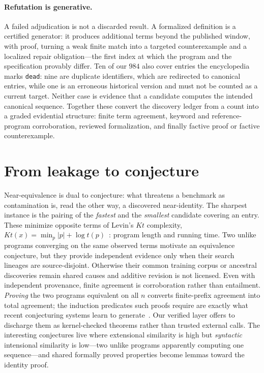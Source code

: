 \documentclass[11pt]{article}
\newcommand{\code}[1]{\texttt{#1}}
\begin{document}
\paragraph{Refutation is generative.} A failed adjudication is not a discarded result. A
formalized definition is a certified generator: it produces additional terms beyond the
published window, with proof, turning a weak finite match into a targeted counterexample
and a localized repair obligation---the first index at which the program and the
specification provably differ. Ten of our $984$ also cover entries the encyclopedia marks
\code{dead}: nine are duplicate identifiers, which are redirected to canonical entries,
while one is an erroneous historical version and must not be counted as a current target.
Neither case is evidence that a candidate computes the intended canonical sequence.
Together these
convert the discovery ledger from a count into a graded evidential structure: finite term
agreement, keyword and reference-program corroboration, reviewed formalization, and
finally factive proof or factive counterexample.

\section{From leakage to conjecture}
\label{sec:conjecture}

Near-equivalence is dual to conjecture: what threatens a benchmark as contamination is, read
the other way, a discovered near-identity. The sharpest instance is the pairing of the
\emph{fastest} and the \emph{smallest} candidate covering an entry. These minimize
opposite terms of Levin's $Kt$ complexity,
$Kt(x)=\min_p |p|+\log t(p)$~\cite{levin1973}: program length
and running time. Two unlike programs converging on the same observed terms motivate an
equivalence conjecture, but they provide independent evidence only when their search
lineages are source-disjoint. Otherwise their common training corpus or ancestral
discoveries remain shared causes and additive revision is not licensed. Even with
independent provenance, finite agreement is corroboration rather than entailment.
\emph{Proving} the two programs equivalent on all $n$
converts finite-prefix agreement into total agreement; the induction predicates such proofs
require are exactly what recent conjecturing systems learn to
generate~\cite{gauthier2025}. Our verified layer offers to discharge them as kernel-checked
theorems rather than trusted external calls. The interesting conjectures live where
extensional similarity is high but \emph{syntactic} intensional similarity is low---two
unlike programs apparently computing one sequence---and shared formally proved properties become lemmas
toward the identity proof.
\end{document}
